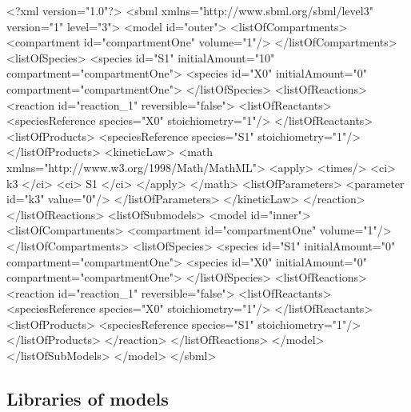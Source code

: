 \documentclass{cekarticle}
\begin{document}
\begin{example}
<?xml version="1.0"?>
<sbml xmlns="http://www.sbml.org/sbml/level3" version="1" level="3">
    <model id="outer">
        <listOfCompartments>
            <compartment id="compartmentOne" volume="1"/>
        </listOfCompartments>
        <listOfSpecies>
            <species id="S1" initialAmount="10" compartment="compartmentOne">
            <species id="X0" initialAmount="0" compartment="compartmentOne">
        </listOfSpecies>
        <listOfReactions>
            <reaction id="reaction_1" reversible="false">
                <listOfReactants>
                    <speciesReference species="X0" stoichiometry="1"/>
                </listOfReactants>
                <listOfProducts>
                    <speciesReference species="S1" stoichiometry="1"/>
                </listOfProducts>
                <kineticLaw>
                    <math xmlns="http://www.w3.org/1998/Math/MathML">
                        <apply>
                            <times/>
                            <ci> k3 </ci>
                            <ci> S1 </ci>
                        </apply>
                    </math>
                    <listOfParameters>
                        <parameter id="k3" value="0"/>
                    </listOfParameters>
                </kineticLaw>
            </reaction>
        </listOfReactions>
        <listOfSubmodels>
            <model id="inner">
                <listOfCompartments>
                    <compartment id="compartmentOne" volume="1"/>
                </listOfCompartments>
                <listOfSpecies>
                    <species id="S1" initialAmount="0" compartment="compartmentOne">
                    <species id="X0" initialAmount="0" compartment="compartmentOne">
                </listOfSpecies>
                <listOfReactions>
                    <reaction id="reaction_1" reversible="false">
                        <listOfReactants>
                            <speciesReference species="X0" stoichiometry="1"/>
                        </listOfReactants>
                        <listOfProducts>
                            <speciesReference species="S1" stoichiometry="1"/>
                        </listOfProducts>
                    </reaction>
               </listOfReactions>
            </model>
        </listOfSubModels>
    </model>
</sbml>

\end{example}

\subsection{Libraries of models}
\end{document}
